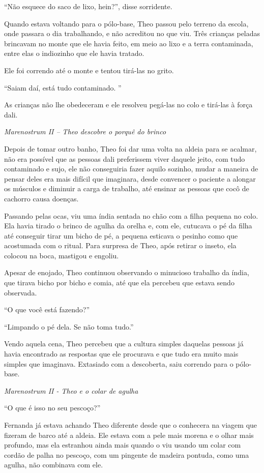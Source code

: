 ``Não esquece do saco de lixo, hein?'', disse sorridente.

Quando estava voltando para o pólo-base, Theo passou pelo terreno da
escola, onde passara o dia trabalhando, e não acreditou no que viu. Três
crianças peladas brincavam no monte que ele havia feito, em meio ao lixo
e a terra contaminada, entre elas o indiozinho que ele havia tratado.

Ele foi correndo até o monte e tentou tirá-las no grito.

``Saiam daí, está tudo contaminado. ''

As crianças não lhe obedeceram e ele resolveu pegá-las no colo e
tirá-las à força dali.

\asterisc

\emph{Marenostrum II -- Theo descobre o porquê do brinco}

Depois de tomar outro banho, Theo foi dar uma volta na aldeia para se
acalmar, não era possível que as pessoas dali preferissem viver daquele
jeito, com tudo contaminado e sujo, ele não conseguiria fazer aquilo
sozinho, mudar a maneira de pensar deles era mais difícil que imaginara,
desde convencer o paciente a alongar os músculos e diminuir a carga de
trabalho, até ensinar as pessoas que cocô de cachorro causa doenças.

Passando pelas ocas, viu uma índia sentada no chão com a filha pequena
no colo. Ela havia tirado o brinco de agulha da orelha e, com ele,
cutucava o pé da filha até conseguir tirar um bicho de pé, a pequena
esticava o pesinho como que acostumada com o ritual. Para surpresa de
Theo, após retirar o inseto, ela colocou na boca, mastigou e engoliu.

Apesar de enojado, Theo continuou observando o minucioso trabalho da
índia, que tirava bicho por bicho e comia, até que ela percebeu que
estava sendo observada.

``O que você está fazendo?''

``Limpando o pé dela. Se não toma tudo.''

Vendo aquela cena, Theo percebeu
que a cultura simples daquelas pessoas já havia encontrado as respostas
que ele procurava e que tudo era muito mais simples que imaginava.
Extasiado com a descoberta, saiu correndo para o pólo-base.

\asterisc

\emph{Marenostrum II - Theo e o colar de agulha}

``O que é isso no seu pescoço?''

Fernanda já estava achando Theo diferente desde que o conhecera na
viagem que fizeram de barco até a aldeia. Ele estava com a pele mais
morena e o olhar mais profundo, mas ela estranhou ainda mais quando o
viu usando um colar com cordão de palha no pescoço, com um pingente de
madeira pontuda, como uma agulha, não combinava com ele.


